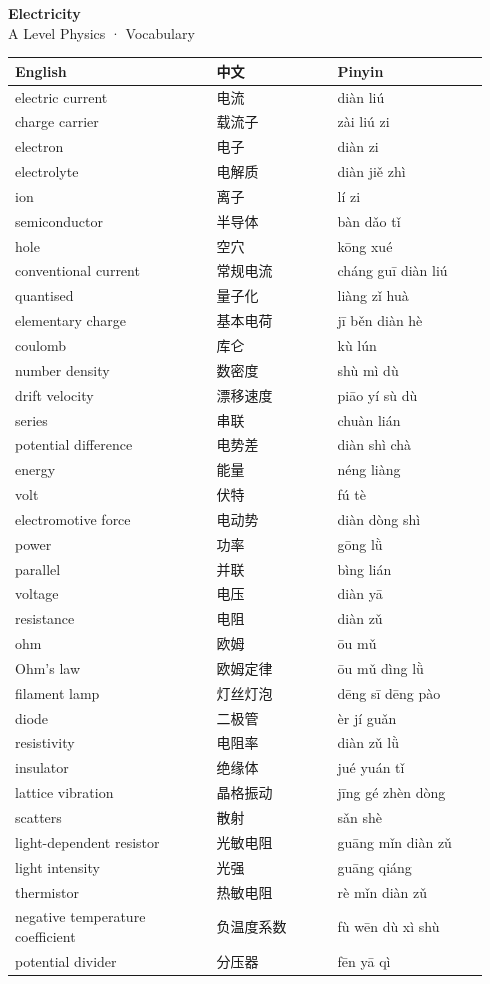 \documentclass[11pt]{article}
\begin{document}
\begin{center}
  {\LARGE\bfseries Electricity}\\[0.35em]
  {\large A Level Physics · Vocabulary}
\end{center}
\vspace{0.6em}

\begin{longtable}{@{}p{0.40\linewidth}p{0.24\linewidth}p{0.30\linewidth}@{}}
\toprule
\textbf{English} & \textbf{中文} & \textbf{Pinyin} \\
\midrule
\endhead
\bottomrule
\endlastfoot
electric current & 电流 & diàn liú \\
charge carrier & 载流子 & zài liú zi \\
electron & 电子 & diàn zi \\
electrolyte & 电解质 & diàn jiě zhì \\
ion & 离子 & lí zi \\
semiconductor & 半导体 & bàn dǎo tǐ \\
hole & 空穴 & kōng xué \\
conventional current & 常规电流 & cháng guī diàn liú \\
quantised & 量子化 & liàng zǐ huà \\
elementary charge & 基本电荷 & jī běn diàn hè \\
coulomb & 库仑 & kù lún \\
number density & 数密度 & shù mì dù \\
drift velocity & 漂移速度 & piāo yí sù dù \\
series & 串联 & chuàn lián \\
potential difference & 电势差 & diàn shì chà \\
energy & 能量 & néng liàng \\
volt & 伏特 & fú tè \\
electromotive force & 电动势 & diàn dòng shì \\
power & 功率 & gōng lǜ \\
parallel & 并联 & bìng lián \\
voltage & 电压 & diàn yā \\
resistance & 电阻 & diàn zǔ \\
ohm & 欧姆 & ōu mǔ \\
Ohm's law & 欧姆定律 & ōu mǔ dìng lǜ \\
filament lamp & 灯丝灯泡 & dēng sī dēng pào \\
diode & 二极管 & èr jí guǎn \\
resistivity & 电阻率 & diàn zǔ lǜ \\
insulator & 绝缘体 & jué yuán tǐ \\
lattice vibration & 晶格振动 & jīng gé zhèn dòng \\
scatters & 散射 & sǎn shè \\
light-dependent resistor & 光敏电阻 & guāng mǐn diàn zǔ \\
light intensity & 光强 & guāng qiáng \\
thermistor & 热敏电阻 & rè mǐn diàn zǔ \\
negative temperature coefficient & 负温度系数 & fù wēn dù xì shù \\
potential divider & 分压器 & fēn yā qì \\
\end{longtable}
\end{document}

